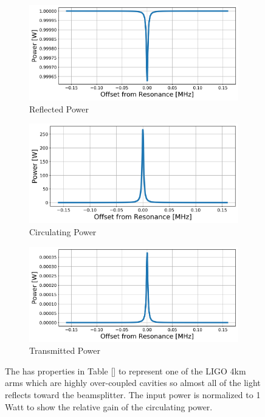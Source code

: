 				\begin{figure}[ht]
			\centering
			\begin{subfigure}[b]{0.45\textwidth}
				\centering
				\includegraphics[width=\textwidth]{../Figures/Arm_Refl.png}
				\caption{Reflected Power}
				\label{fig:FP_refl}
			\end{subfigure}
			\hfill
			\begin{subfigure}[b]{0.45\textwidth}
				\centering
				\includegraphics[width=\textwidth]{../Figures/Arm_Circ.png}
				\caption{Circulating Power}
				\label{fig:FP_circ}
			\end{subfigure}
			\hfill
			\begin{subfigure}[b]{0.45\textwidth}
				\centering
				\includegraphics[width=\textwidth]{../Figures/Arm_Tran.png}
				\caption{Transmitted Power}
				\label{fig:FP_tran}
			\end{subfigure}
			\caption[The reflected, circulating, and transmitted powers for a single Fabry-Perot cavity.]
			{The  has properties in Table [] to represent one of the LIGO 4km arms which are highly over-coupled cavities so almost all of the light reflects toward the beamsplitter.  The input power is normalized to 1 Watt to show the relative gain of the circulating power.}
			\label{fig:FP_pwrs}
		\end{figure}
